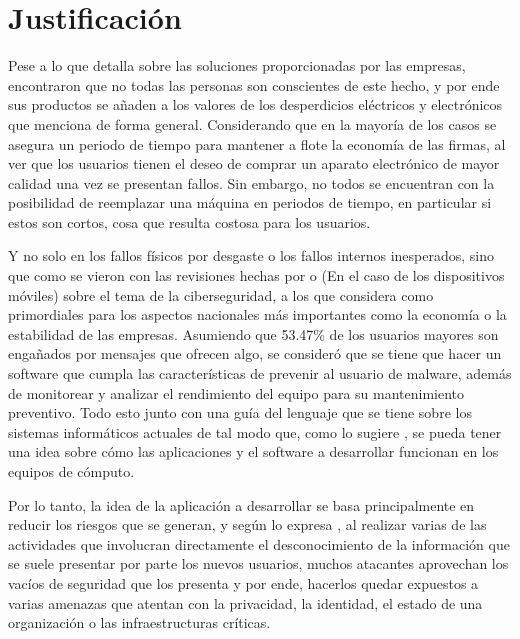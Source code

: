 \pagebreak
\section{Justificación}

Pese a lo que \textcite{Herat2020} detalla sobre las soluciones proporcionadas
por las empresas, \textcite{Hartl2023} encontraron que no todas las personas son
conscientes de este hecho, y por ende sus productos se añaden a los valores de
los desperdicios eléctricos y electrónicos que \textcite{Seif2024} menciona de
forma general. Considerando que en la mayoría de los casos se asegura un periodo
de tiempo para mantener a flote la economía de las firmas, al ver que los
usuarios tienen el deseo de comprar un aparato electrónico de mayor calidad una
vez se presentan fallos. Sin embargo, no todos se encuentran con la posibilidad
de reemplazar una máquina en periodos de tiempo, en particular si estos son
cortos, cosa que resulta costosa para los usuarios.

Y no solo en los fallos físicos por desgaste o los fallos internos inesperados,
sino que como se vieron con las revisiones hechas por \textcite{Rathore2023} o
\textcite{Waqar2023} (En el caso de los dispositivos móviles) sobre el tema de
la ciberseguridad, a los que \textcite{CanoMartinez2022} considera como
primordiales para los aspectos nacionales más importantes como la economía o la
estabilidad de las empresas. Asumiendo que 53.47\% de los usuarios
mayores son engañados por mensajes que ofrecen algo, se consideró que se tiene
que hacer un software que cumpla las características de prevenir al usuario de
malware, además de monitorear y analizar el rendimiento del equipo para su
mantenimiento preventivo. Todo esto junto con una guía del lenguaje que se tiene
sobre los sistemas informáticos actuales de tal modo que, como lo sugiere
\textcite{Nurul2021}, se pueda tener una idea sobre cómo las aplicaciones y el
software a desarrollar funcionan en los equipos de cómputo. 

Por lo tanto, la idea de la aplicación a desarrollar se basa principalmente en
reducir los riesgos que se generan, y según lo expresa \textcite{Mosquera2019},
al realizar varias de las actividades que involucran directamente el
desconocimiento de la información que se suele presentar por parte los nuevos
usuarios, muchos atacantes aprovechan los vacíos de seguridad que los presenta
y por ende, hacerlos quedar expuestos a varias amenazas que atentan con la
privacidad, la identidad, el estado de una organización o las infraestructuras
críticas. \parencite[e.g.,][]{CanoMartinez2022} 
